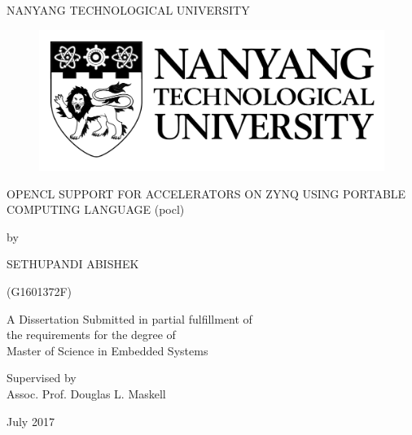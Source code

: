 \begin{titlepage}
\begin{center}
{\LARGE {NANYANG TECHNOLOGICAL UNIVERSITY}}
\begin{figure}[!t]
\centering
\includegraphics[width= 8 cm]{figures/ntu_logo.pdf}
\end{figure} 
\vspace*{0.7in}
{\large OPENCL SUPPORT FOR ACCELERATORS ON ZYNQ USING PORTABLE COMPUTING LANGUAGE (pocl)}
\par
\vspace{0.4 in}
{\large by\\}
\vspace{0.2 in}
{\large SETHUPANDI ABISHEK

(G1601372F)}
\vspace{0.1 in}
\par
\vfill
A Dissertation Submitted in partial fulfillment of \\ the requirements for the degree of \\ Master of Science in Embedded Systems
\par
\vspace{0.4in}
Supervised by\\
\vspace{0.1in}
{\large Assoc. Prof. Douglas L. Maskell \\}
\par
\vspace{0.15in}
July 2017
\end{center}
\end{titlepage}